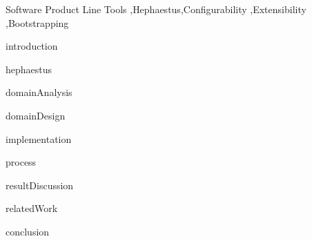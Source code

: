 \documentclass[preprint,12pt]{elsarticle}
\newcommand{\hpl}{\textsf{Hephaestus-PL}}
\newcommand{\hp}{\textsf{Hephaestus}}
\begin{document}
\begin{frontmatter}
\begin{abstract}
  Tool support is essential for application engineering in software
  product lines.
  Existing tools are more or less specialized in terms of the
  artifacts and the variability mechanisms that they address. There is
  the open problem of providing general configurability and
  extensibility with regard to the artifacts and variability
  mechanisms for such tools.
  This paper addresses the problem by exploring the underlying
  commonality and adequately managing variability of such tools. More
  specifically, the paper presents domain analysis, design,
  implementation, and a supporting process for enhancing the existing
  \hp{} tool for software product lines into \hpl---a proper product
  line for such tools. Such enhancement is essentially a form of
  bootstrapping.
  An assessment substantiates that \hpl{} actually provides improved
  configurability and flexibility when compared to previous variations
  of \hp{}.
\end{abstract}

\begin{keyword}
Software Product Line Tools \sep \hp \sep Configurability \sep Extensibility \sep  Bootstrapping


\end{keyword}

\end{frontmatter}


 {introduction}

 {hephaestus}

 {domainAnalysis}

 {domainDesign}

 {implementation}

 {process}

 {resultDiscussion}

 {relatedWork}

 {conclusion}


\end{document}
